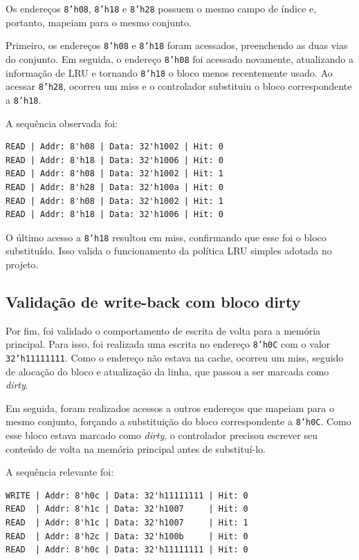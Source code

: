 ﻿\documentclass[12pt,a4paper]{article}
\begin{document}
Os endereços \texttt{8'h08}, \texttt{8'h18} e \texttt{8'h28} possuem o mesmo campo de índice e, portanto, mapeiam para o mesmo conjunto.

Primeiro, os endereços \texttt{8'h08} e \texttt{8'h18} foram acessados, preenchendo as duas vias do conjunto. Em seguida, o endereço \texttt{8'h08} foi acessado novamente, atualizando a informação de LRU e tornando \texttt{8'h18} o bloco menos recentemente usado. Ao acessar \texttt{8'h28}, ocorreu um miss e o controlador substituiu o bloco correspondente a \texttt{8'h18}.

A sequência observada foi:

\begin{verbatim}
READ | Addr: 8'h08 | Data: 32'h1002 | Hit: 0
READ | Addr: 8'h18 | Data: 32'h1006 | Hit: 0
READ | Addr: 8'h08 | Data: 32'h1002 | Hit: 1
READ | Addr: 8'h28 | Data: 32'h100a | Hit: 0
READ | Addr: 8'h08 | Data: 32'h1002 | Hit: 1
READ | Addr: 8'h18 | Data: 32'h1006 | Hit: 0
\end{verbatim}

O último acesso a \texttt{8'h18} resultou em miss, confirmando que esse foi o bloco substituído. Isso valida o funcionamento da política LRU simples adotada no projeto.

\subsection{Validação de write-back com bloco dirty}

Por fim, foi validado o comportamento de escrita de volta para a memória principal. Para isso, foi realizada uma escrita no endereço \texttt{8'h0C} com o valor \texttt{32'h11111111}. Como o endereço não estava na cache, ocorreu um miss, seguido de alocação do bloco e atualização da linha, que passou a ser marcada como \textit{dirty}.

Em seguida, foram realizados acessos a outros endereços que mapeiam para o mesmo conjunto, forçando a substituição do bloco correspondente a \texttt{8'h0C}. Como esse bloco estava marcado como \textit{dirty}, o controlador precisou escrever seu conteúdo de volta na memória principal antes de substituí-lo.

A sequência relevante foi:

\begin{verbatim}
WRITE | Addr: 8'h0c | Data: 32'h11111111 | Hit: 0
READ  | Addr: 8'h1c | Data: 32'h1007     | Hit: 0
READ  | Addr: 8'h1c | Data: 32'h1007     | Hit: 1
READ  | Addr: 8'h2c | Data: 32'h100b     | Hit: 0
READ  | Addr: 8'h0c | Data: 32'h11111111 | Hit: 0
\end{verbatim}
\end{document}

